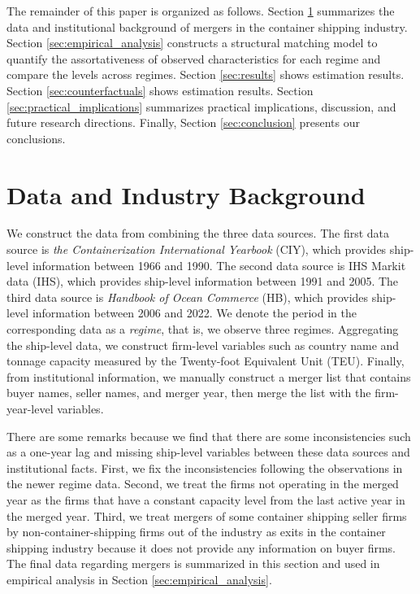 \documentclass[10pt]{article}
\begin{document}
The remainder of this paper is organized as follows. 
Section \ref{sec:data_and_institutional_background} summarizes the data and institutional background of mergers in the container shipping industry.
Section \ref{sec:empirical_analysis} constructs a structural matching model to quantify the assortativeness of observed characteristics for each regime and compare the levels across regimes.
Section \ref{sec:results} shows estimation results.
Section \ref{sec:counterfactuals} shows estimation results.
Section \ref{sec:practical_implications} summarizes practical implications, discussion, and future research directions.
Finally, Section \ref{sec:conclusion} presents our conclusions.


\section{Data and Industry Background}\label{sec:data_and_institutional_background}

We construct the data from combining the three data sources. 
The first data source is \textit{the Containerization International Yearbook} (CIY), which provides ship-level information between 1966 and 1990.
The second data source is IHS Markit data (IHS), which provides ship-level information between 1991 and 2005.
The third data source is \textit{Handbook of Ocean Commerce} (HB), which provides ship-level information between 2006 and 2022. 
We denote the period in the corresponding data as a \textit{regime}, that is, we observe three regimes.
Aggregating the ship-level data, we construct firm-level variables such as country name and tonnage capacity measured by the Twenty-foot Equivalent Unit (TEU). 
Finally, from institutional information, we manually construct a merger list that contains buyer names, seller names, and merger year, then merge the list with the firm-year-level variables. 

There are some remarks because we find that there are some inconsistencies such as a one-year lag and missing ship-level variables between these data sources and institutional facts. 
First, we fix the inconsistencies following the observations in the newer regime data. 
Second, we treat the firms not operating in the merged year as the firms that have a constant capacity level from the last active year in the merged year. %
Third, we treat mergers of some container shipping seller firms by non-container-shipping firms out of the industry as exits in the container shipping industry because it does not provide any information on buyer firms.
The final data regarding mergers is summarized in this section and used in empirical analysis in Section \ref{sec:empirical_analysis}.
\end{document}
